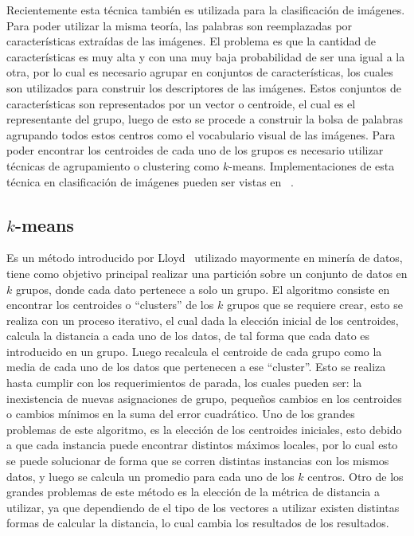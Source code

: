 Recientemente esta técnica también es utilizada para la clasificación de imágenes. Para poder utilizar la misma teoría, las palabras son reemplazadas por características extraídas de las imágenes. El problema es que la cantidad de características es muy alta y con una muy baja probabilidad de ser una igual a la otra, por lo cual es necesario agrupar en conjuntos de características, los cuales son utilizados para construir los descriptores de las imágenes. Estos conjuntos de características son representados por un vector o centroide, el cual es el representante del grupo, luego de esto se procede a construir la bolsa de palabras agrupando todos estos centros como el vocabulario visual de las imágenes. Para poder encontrar los centroides de cada uno de los grupos es necesario utilizar técnicas de agrupamiento o clustering como $k$-means. Implementaciones de esta técnica en clasificación de imágenes pueden ser vistas en ~\cite{Csurka2004,Dollar2005,Sivic2009}.

	\subsection{$k$-means}
	\label{sec:k-means}
	Es un método introducido por Lloyd~\cite{Lloyd1982} utilizado mayormente en minería de datos, tiene como objetivo principal realizar una partición sobre un conjunto de datos en $k$ grupos, donde cada dato pertenece a solo un grupo.
	El algoritmo consiste en encontrar los centroides o ``clusters'' de los $k$ grupos que se requiere crear, esto se realiza con un proceso iterativo, el cual dada la elección inicial de los centroides, calcula la distancia a cada uno de los datos, de tal forma que cada dato es introducido en un grupo. Luego recalcula el centroide de cada grupo como la media de cada uno de los datos que pertenecen a ese ``cluster''. Esto se realiza hasta cumplir con los requerimientos de parada, los cuales pueden ser: la inexistencia de nuevas asignaciones de grupo, pequeños cambios en los centroides o cambios mínimos en la suma del error cuadrático.
	Uno de los grandes problemas de este algoritmo, es la elección de los centroides iniciales, esto debido a que cada instancia puede encontrar distintos máximos locales, por lo cual esto se puede solucionar de forma que se corren distintas instancias con los mismos datos, y luego se calcula un promedio para cada uno de los $k$ centros.
	Otro de los grandes problemas de este método es la elección de la métrica de distancia a utilizar, ya que dependiendo de el tipo de los vectores a utilizar existen distintas formas de calcular la distancia, lo cual cambia los resultados de los resultados.
			
